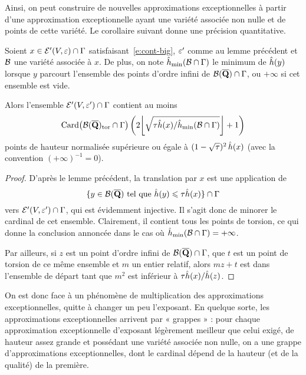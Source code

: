 Ainsi, on peut construire de nouvelles approximations exceptionnelles à partir
d'une approximation exceptionnelle ayant une variété associée non nulle et de
points de cette variété. Le corollaire suivant donne une précision
quantitative.

\begin{coro} \label{c:factory}
  Soient \( x \in \mathcal E'(V, \varepsilon) \cap \Gamma \)
  satisfaisant~\eqref{e:cont-big}, \( \varepsilon' \) comme au lemme précédent et \(
    \mathcal B \) une variété associée à \( x \). De plus, on note
  \( \hat h_{\mathrm{min}}(\mathcal B \cap \Gamma) \) le minimum de \( \hat h (y) \) lorsque \( y \)
  parcourt l'ensemble des points d'ordre infini de
  \( \mathcal B(\overline{{\mathbf{Q}}}) \cap \Gamma \), ou \( +\infty \) si cet ensemble est vide.

  Alors l'ensemble \( \mathcal E'(V, \varepsilon') \cap \Gamma \) contient au moins
  \begin{equation}
    \card \bigl( \vai(\Qbar)_\torsion \cap \grp \bigr)
    \left(
      2 \floor*{ \sqrt{ \tau \hautn x / \hmin(\vai \cap \grp) } } + 1
    \right)
  \end{equation}
  points de hauteur normalisée supérieure ou égale à
  \( (1-\sqrt\tau)^{2} \, \hat h (x) \) (avec la convention \( (+\infty)^{-1} =
    0 \)).
\end{coro}

\begin{proof}
  D'après le lemme précédent, la translation par \( x \) est une application
  de
  \begin{equation}
    \lbrace
      y \in \mathcal B(\overline{{\mathbf{Q}}})
      \text{ tel que }
      \hat h (y) \leqslant \tau \hat h (x)
    \rbrace
    \cap \Gamma
  \end{equation}
  vers \( \mathcal E'(V, \varepsilon') \cap \Gamma \), qui est évidemment injective. Il
  s'agit donc de minorer le cardinal de cet ensemble. Clairement, il contient
  tous les points de torsion, ce qui donne la conclusion annoncée dans le cas
  où \( \hat h_{\mathrm{min}}(\mathcal B \cap \Gamma) = + \infty \).

  Par ailleurs, si \( z \) est un point d'ordre infini de
  \( \mathcal B(\overline{{\mathbf{Q}}}) \cap \Gamma \), que \( t \) est un point de torsion de ce même
  ensemble et \( m \) un entier relatif, alors \( m z + t \) est dans
  l'ensemble de départ tant que \( m^2 \) est inférieur à
  \( \tau \hat h (x) / \hat h (z) \).
\end{proof}

On est donc face à un phénomène de multiplication des approximations
exceptionnelles, quitte à changer un peu l'exposant. En quelque sorte, les
approximations exceptionnelles arrivent par « grappes » : pour chaque
approximation exceptionnelle d'exposant légèrement meilleur que celui exigé,
de hauteur assez grande et possédant une variété associée non nulle, on a une
grappe d'approximations exceptionnelles, dont le cardinal dépend de la hauteur
(et de la qualité) de la première.

